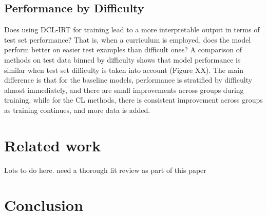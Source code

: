 \documentclass[letterpaper]{article} %
\begin{document}
\subsection{Performance by Difficulty}
Does using DCL-IRT for training lead to a more interpretable output in terms of test set performance?
That is, when a curriculum is employed, does the model perform better on easier test examples than difficult ones?
A comparison of methods on test data binned by difficulty shows that model performance is similar when test set difficulty is taken into account (Figure XX).
The main difference is that for the baseline models, performance is stratified by difficulty almost immediately, and there are small improvements across groups during training, while for the CL methods, there is consistent improvement across groups as training continues, and more data is added. 


\section{Related work}

Lots to do here. need a thorough lit review as part of this paper 

\section{Conclusion} 
\end{document}
